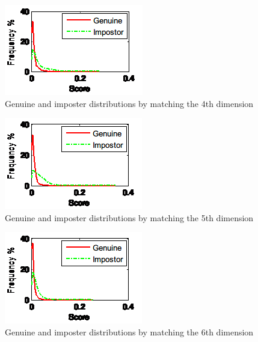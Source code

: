 \begin{figure}[htb]
  \begin{center}
    \includegraphics[scale=1]{ch-experiment/figures/11d}
    \caption{Genuine and imposter distributions by matching the 4th dimension}
    \label{fig:experiment:11d}
  \end{center}
\end{figure}

\begin{figure}[htb]
  \begin{center}
    \includegraphics[scale=1]{ch-experiment/figures/11e}
    \caption{Genuine and imposter distributions by matching the 5th dimension}
    \label{fig:experiment:11e}
  \end{center}
\end{figure}

\begin{figure}[htb]
  \begin{center}
    \includegraphics[scale=1]{ch-experiment/figures/11f}
    \caption{Genuine and imposter distributions by matching the 6th dimension}
    \label{fig:experiment:11f}
  \end{center}
\end{figure}

